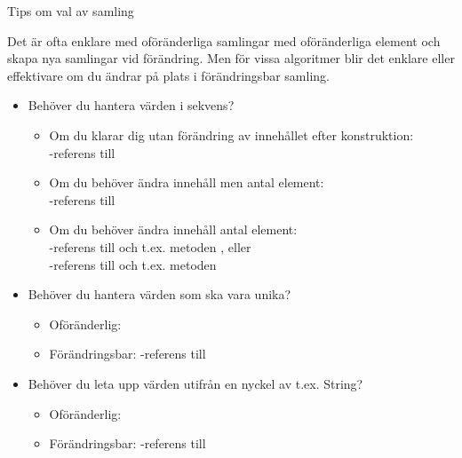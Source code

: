 \begin{Slide}{Tips om val av samling}\SlideFontSmall

Det är ofta enklare med oföränderliga samlingar med oföränderliga element och skapa nya samlingar vid förändring. Men för vissa algoritmer blir det enklare eller effektivare om du ändrar på plats i förändringsbar samling.

\begin{itemize}
\item Behöver du hantera värden i sekvens?
\begin{itemize}\SlideFontTiny
\item Om du klarar dig utan förändring av innehållet efter konstruktion:\\
-referens till 
\item Om du behöver ändra innehåll men  antal element:\\
-referens till 
\item Om du behöver ändra innehåll  antal element:
\\ -referens till  och t.ex. metoden , eller \\
-referens till  och t.ex. metoden 
\end{itemize}

\item Behöver du hantera värden  som ska vara unika?
\begin{itemize}\SlideFontTiny
\item Oföränderlig: 
\item Förändringsbar: -referens till 
\end{itemize}

\item Behöver du leta upp värden  utifrån en nyckel av t.ex. String?
\begin{itemize}\SlideFontTiny
\item Oföränderlig: 
\item Förändringsbar: -referens till 
\end{itemize}


\end{itemize}
\end{Slide}


